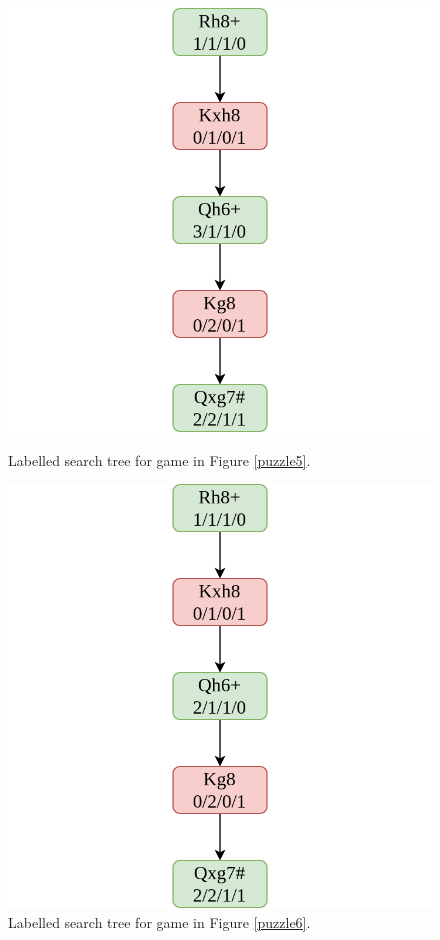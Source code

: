 \begin{figure}[H]
    \begin{minipage}{0.475\textwidth}
        \centering
        \includegraphics[width=\textwidth]{project/img/trees/3.drawio.png}
        \caption{Labelled search tree for game in Figure \ref{puzzle5}.}
        \label{tree3}
    \end{minipage}
    \hspace{0.05\textwidth}
    \begin{minipage}{0.475\textwidth}
        \centering
        \includegraphics[width=\textwidth]{project/img/trees/4.drawio.png}
        \caption{Labelled search tree for game in Figure \ref{puzzle6}.}
        \label{tree4}
    \end{minipage}
\end{figure}

